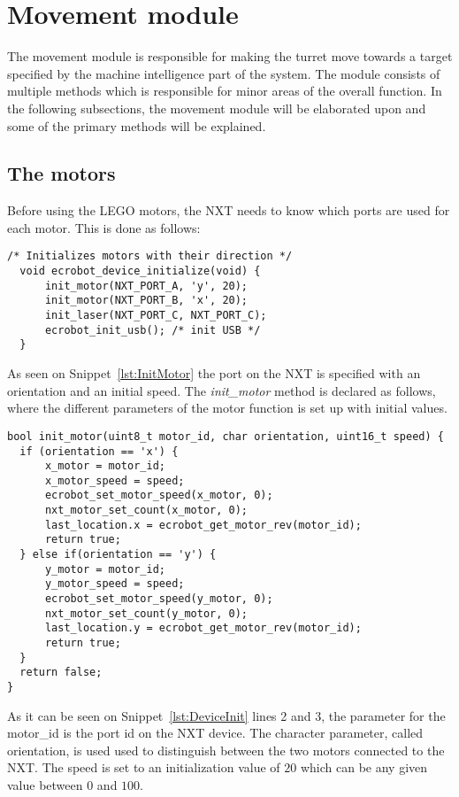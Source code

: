 \section{Movement module}
\label{sec:movement}
The movement module is responsible for making the turret move towards a target specified by the machine intelligence part of the system.
The module consists of multiple methods which is responsible for minor areas of the overall function.
In the following subsections, the movement module will be elaborated upon and some of the primary methods will be explained.

\subsection{The motors}
Before using the LEGO motors, the NXT needs to know which ports are used for each motor.
This is done as follows:
\begin{lstlisting}[language=CSharp, label={lst:DeviceInit},caption={ecrobot\_device\_initialize method from nxt.c}]
  /* Initializes motors with their direction */
  void ecrobot_device_initialize(void) {
      init_motor(NXT_PORT_A, 'y', 20);
      init_motor(NXT_PORT_B, 'x', 20);
      init_laser(NXT_PORT_C, NXT_PORT_C);
      ecrobot_init_usb(); /* init USB */
  }
\end{lstlisting}
As seen on Snippet~\ref{lst:InitMotor} the port on the NXT is specified with an orientation and an initial speed.
The \textit{init\_motor} method is declared as follows, where the different parameters of the motor function is set up with initial values.

\begin{lstlisting}[language=CSharp,label={lst:InitMotor},caption={init\_motor method from movement.c}]
bool init_motor(uint8_t motor_id, char orientation, uint16_t speed) {
  if (orientation == 'x') {
      x_motor = motor_id;
      x_motor_speed = speed;
      ecrobot_set_motor_speed(x_motor, 0);
      nxt_motor_set_count(x_motor, 0);
      last_location.x = ecrobot_get_motor_rev(motor_id);
      return true;
  } else if(orientation == 'y') {
      y_motor = motor_id;
      y_motor_speed = speed;
      ecrobot_set_motor_speed(y_motor, 0);
      nxt_motor_set_count(y_motor, 0);
      last_location.y = ecrobot_get_motor_rev(motor_id);
      return true;
  }
  return false;
}
\end{lstlisting}
As it can be seen on Snippet~\ref{lst:DeviceInit} lines 2 and 3, the parameter for the motor\_id is the port id on the NXT device.
The character parameter, called orientation, is used used to distinguish between the two motors connected to the NXT.
The speed is set to an initialization value of $20$ which can be any given value between $0$ and $100$.

